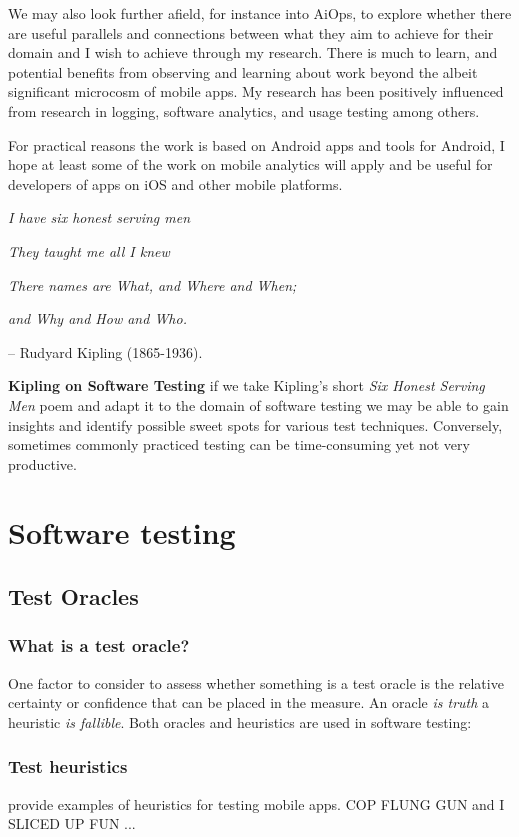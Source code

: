 We may also look further afield, for instance into AiOps, to explore whether there are useful parallels and connections between what they aim to achieve for their domain and I wish to achieve through my research. There is much to learn, and potential benefits from observing and learning about work beyond the albeit significant microcosm of mobile apps. My research has been positively influenced from research in logging, software analytics, and usage testing among others.


For practical reasons the work is based on Android apps and tools for Android, I hope at least some of the work on mobile analytics will apply and be useful for developers of apps on iOS and other mobile platforms.

\textit{I have six honest serving men}

\textit{They taught me all I knew}

\textit{There names are What, and Where and When;}

\textit{and Why and How and Who.}

– Rudyard Kipling (1865-1936).

\textbf{Kipling on Software Testing} if we take Kipling's short \textit{Six Honest Serving Men} poem and adapt it to the domain of software testing we may be able to gain insights and identify possible sweet spots for various test techniques. Conversely, sometimes commonly practiced testing can be time-consuming yet not very productive.

\section{Software testing}
\subsection{Test Oracles}

\subsubsection{What is a test oracle?}
One factor to consider to assess whether something is a test oracle is the relative certainty or confidence that can be placed in the measure. An oracle \textit{is truth} a heuristic \textit{is fallible}. Both oracles and heuristics are used in software testing:

\subsubsection{Test heuristics}
provide examples of heuristics for testing mobile apps. COP FLUNG GUN and I SLICED UP FUN ...

